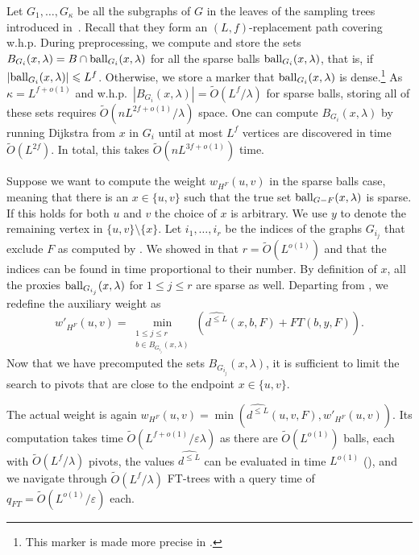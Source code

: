 \documentclass{article}\usepackage[a4paper,margin=20mm]{geometry}
\newcommand*{\Otilde}{\widetilde{O}}
\newcommand*{\ball}{\mbox{\rm ball}}
\renewcommand{\le}{\leqslant}
\begin{document}
Let $G_1, \ldots, G_\kappa$ be all the subgraphs of $G$ in the leaves of the sampling trees
introduced in~.
Recall that they form an $(L,f)$-replacement path covering w.h.p.
During preprocessing, we compute and store the sets 
$B_{G_i}(x, \lambda) = B \cap \ball_{G_i}(x,\lambda)$ 
for all the sparse balls $\ball_{G_i}(x, \lambda)$, 
that is, if $|\ball_{G_i}(x, \lambda)| \le L^f$.
Otherwise, we store a marker that $\ball_{G_i}(x, \lambda)$ is dense.\footnote{
	This marker is made more precise in .
} 
As $\kappa = L^{f+o(1)}$ and w.h.p.\ $|B_{G_i}(x, \lambda)| = \Otilde(L^{f}/\lambda)$
for sparse balls, storing all of these sets requires 
$\Otilde(nL^{2f+o(1)}/\lambda)$ space.
One can compute $B_{G_i}(x, \lambda)$ by running Dijkstra from $x$ in $G_i$ until at most $L^{f}$ vertices are discovered in time $\Otilde(L^{2f})$.
In total, this takes $\Otilde(nL^{3f+o(1)})$ time.

Suppose we want to compute the weight $w_{H^F}(u,v)$ in the sparse balls case,
meaning that there is an $x \in \{u,v\}$ such that the true set $\ball_{G-F}(x,\lambda)$ is sparse.
If this holds for both $u$ and $v$ the choice of $x$ is arbitrary.
We use $y$ to denote the remaining vertex in $\{u,v\}{\setminus}\{x\}$.
Let $i_1, \ldots, i_r$ be the indices of the graphs $G_{i_j}$ that exclude $F$ 
as computed by . 
We showed in  
that $r =\Otilde(L^{o(1)})$ and that the indices can be found in time proportional to their number.
By definition of $x$, all the proxies $\ball_{G_{i_j}}(x,\lambda)$ for $1 \le j \le r$ are sparse as well.
Departing from , we redefine the auxiliary weight as
\begin{equation}
\label{eq:sparse-pivots}
	w'_{H^F}(u,v) = \min_{
		\substack{
			1\le j \le r \\
			b \in B_{G_{i_j}}(x,\lambda)} 
		}\left(\widehat{d^{\le L}}(x,b,F) + FT(b,y,F)\right).
\end{equation}
Now that we have precomputed the sets $B_{G_{i_j}}(x,\lambda)$,
it is sufficient to limit the search to pivots that are close to the endpoint $x \in \{u, v\}$.

The actual weight is again
$w_{H^F}(u,v) = \min(\widehat{d^{\le L}}(u,v,F), w'_{H^F}(u,v))$.
Its computation takes time $\Otilde(L^{f+o(1)}/\varepsilon\lambda)$
as there are $\Otilde(L^{o(1)})$ balls, each with $\Otilde(L^f/\lambda)$ pivots,
the values $\widehat{d^{\le L}}$
can be evaluated in time $L^{o(1)}$ (),
and we navigate through $\Otilde(L^{f}/\lambda)$ FT-trees
with a query time of $q_{FT} = \Otilde(L^{o(1)}/\varepsilon)$ each. 
\end{document}
